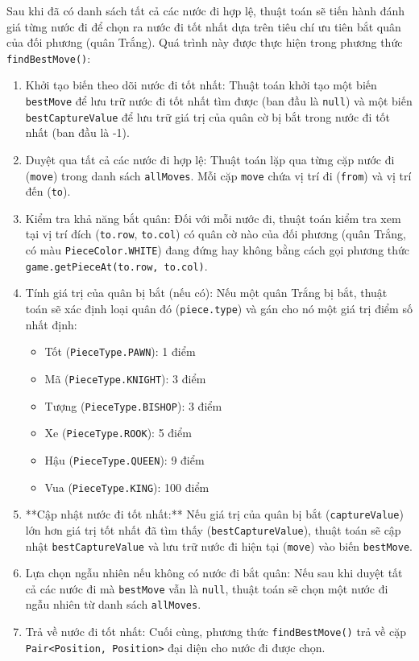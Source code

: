 \documentclass[a4paper,12pt]{article}
\begin{document}
\noindent Sau khi đã có danh sách tất cả các nước đi hợp lệ, thuật toán sẽ tiến hành đánh giá từng nước đi để chọn ra nước đi tốt nhất dựa trên tiêu chí ưu tiên bắt quân của đối phương (quân Trắng). Quá trình này được thực hiện trong phương thức \texttt{findBestMove()}:
\begin{enumerate}[label=(\roman*)]
    \item Khởi tạo biến theo dõi nước đi tốt nhất: Thuật toán khởi tạo một biến \texttt{bestMove} để lưu trữ nước đi tốt nhất tìm được (ban đầu là \texttt{null}) và một biến \texttt{bestCaptureValue} để lưu trữ giá trị của quân cờ bị bắt trong nước đi tốt nhất (ban đầu là -1).
    \item Duyệt qua tất cả các nước đi hợp lệ: Thuật toán lặp qua từng cặp nước đi (\texttt{move}) trong danh sách \texttt{allMoves}. Mỗi cặp \texttt{move} chứa vị trí đi (\texttt{from}) và vị trí đến (\texttt{to}).
    \item Kiểm tra khả năng bắt quân: Đối với mỗi nước đi, thuật toán kiểm tra xem tại vị trí đích (\texttt{to.row}, \texttt{to.col}) có quân cờ nào của đối phương (quân Trắng, có màu \texttt{PieceColor.WHITE}) đang đứng hay không bằng cách gọi phương thức \texttt{game.getPieceAt(to.row, to.col)}.
    \item Tính giá trị của quân bị bắt (nếu có): Nếu một quân Trắng bị bắt, thuật toán sẽ xác định loại quân đó (\texttt{piece.type}) và gán cho nó một giá trị điểm số nhất định:
    \begin{itemize}[label=$\cdot$]
        \item Tốt (\texttt{PieceType.PAWN}): 1 điểm
        \item Mã (\texttt{PieceType.KNIGHT}): 3 điểm
        \item Tượng (\texttt{PieceType.BISHOP}): 3 điểm
        \item Xe (\texttt{PieceType.ROOK}): 5 điểm
        \item Hậu (\texttt{PieceType.QUEEN}): 9 điểm
        \item Vua (\texttt{PieceType.KING}): 100 điểm
    \end{itemize}
    \item **Cập nhật nước đi tốt nhất:** Nếu giá trị của quân bị bắt (\texttt{captureValue}) lớn hơn giá trị tốt nhất đã tìm thấy (\texttt{bestCaptureValue}), thuật toán sẽ cập nhật \texttt{bestCaptureValue} và lưu trữ nước đi hiện tại (\texttt{move}) vào biến \texttt{bestMove}.
    \item Lựa chọn ngẫu nhiên nếu không có nước đi bắt quân: Nếu sau khi duyệt tất cả các nước đi mà \texttt{bestMove} vẫn là \texttt{null}, thuật toán sẽ chọn một nước đi ngẫu nhiên từ danh sách \texttt{allMoves}.
    \item Trả về nước đi tốt nhất: Cuối cùng, phương thức \texttt{findBestMove()} trả về cặp \texttt{Pair<Position, Position>} đại diện cho nước đi được chọn.
\end{enumerate}
\end{document}
